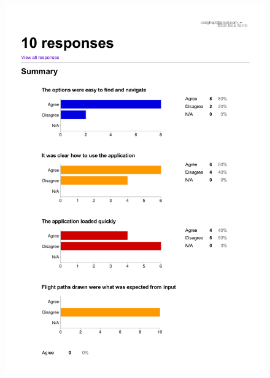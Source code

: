 \begin{figure}[h!]
    \includegraphics[width=15cm,height=18cm,page=2]{images/questionnaireResults.pdf}
\end{figure}

